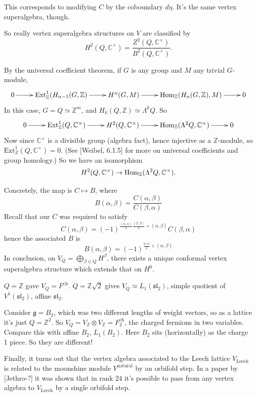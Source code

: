 This corresponds to modifying $C$ by the
coboundary $d\eta$.
It's the same vertex superalgebra, though.

So really vertex superalgebra structures on
$V$
are classified by
$$
H^{2}(Q,\mathbb{C}^\times)=\frac{Z^2(Q,
\mathbb{C}^\times)}
{B^2(Q,\mathbb{C}^\times)}.
$$

\medskip\noindent
By the universal coefficient theorem,
if $G$ is any group and $M$ any trivial
$G$-module,
$$
\xymatrix{
0\ar[r]&\text{Ext}^1_\mathbb{Z}(H_{n-1}(G,
\mathbb{Z})\ar[r]
&H^{n}(G,M)\ar[r]
&\Hom_{\mathbb{Z}}(H_n(G,\mathbb{Z}),M)\ar[r]
&0
}
$$
In this case, $G=Q\simeq \mathbb{Z}^m$,
and $H_k(Q,\mathbb{Z}) \simeq \Lambda^kQ$.
So
$$
\xymatrix{
0\ar[r]&
\text{Ext}^1_{\mathbb{Z}}(Q,\mathbb{C}
^\times)\ar[r]&
H^{2}(Q,\mathbb{C}^\times)\ar[r]&
\Hom_{\mathbb{Z}}(\Lambda^2Q,\mathbb{C}
^\times)\ar[r]&0
}
$$
Now since $\mathbb{C}^\times$ is a divisible
group (algebra fact),
hence injective as a $\mathbb{Z}$-module,
so
$\text{Ext}^1_{\mathbb{Z}}(Q,\mathbb{C}
^\times)=0$.
(See [Weibel, 6.1.5] for more on universal
coefficients and group homology.)
So we have an isomorphism
$$
H^{2}(Q,\mathbb{C}^\times) \to
\mathop{\mathrm{Hom}}\nolimits_{\mathbb{Z}}(\Lambda^2Q,\mathbb{C}
^\times).
$$

Concretely, the map is $C \mapsto  B$, where
$$
B(\alpha,\beta)=\frac{C(\alpha,\beta)}
{C(\beta,\alpha)}
$$
Recall that our $C$ was required to satisfy
$$
C(\alpha,\beta)=(-1)^{\frac{(\alpha,\alpha)}
{2}\frac{(\beta,\beta)}{2}
+(\alpha,\beta)}C(\beta,\alpha)
$$
hence the associated $B$ is
$$
B(\alpha,\beta)=(-1)^{\frac{\alpha,\alpha}{2}
+(\alpha,\beta)}
$$
In conclusion, on $V_Q=\bigoplus_{\beta \in
Q}H^\beta$,
there exists a unique conformal vertex
superalgebra structure
which extends that on $H^0$.

\medskip\noindent
$Q=\mathbb{Z}$ gave $V_Q=F^{\text{ch}}$.
$Q=\mathbb{Z}\sqrt{2}$ gives $V_Q\simeq
L_1(\mathfrak{sl}_2)$,
simple quotient of $V^1(\mathfrak{sl}_2)$,
affine $\mathfrak{sl}_2$.

Consider $\mathfrak{g}=B_2$, which was two
different lengths of weight vectors,
so as a lattice it's just $Q=\mathbb{Z}^2$.
So $V_Q=V_\mathbb{Z} \otimes
V_\mathbb{Z}=F^{\text{ch}}_2$,
the charged fermions in two variables.
Compare this with affine $B_2$, $L_1(B_2)$.
Here $B_2$ sits (horizontally)
as the charge 1 piece. So they are different!

Finally, it turns out that the vertex algebra
associated
to the Leech lattice $V_{\text{Leech}}$ is
related
to the moonshine module $V^{\text{natural}}$
by
an orbifold step.
In a paper by [Jethro-?] it was shown that in
rank 24 it's possible to pass from any vertex
algebra to $V_{\text{Leech}}$ by a single
orbifold step.


